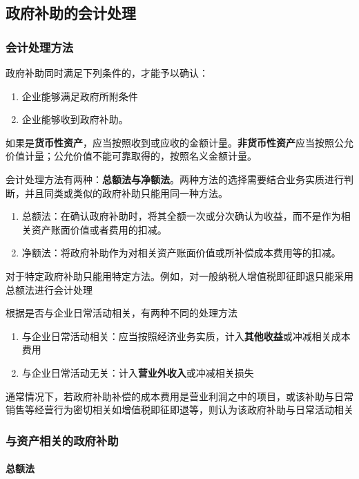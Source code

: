 \documentclass[UTF8,12pt]{ctexart}
\numberwithin{equation}{section} %
\numberwithin{figure}{section}
\numberwithin{table}{section}
\begin{document}
	\subsection{政府补助的会计处理}
	\subsubsection{会计处理方法}
	政府补助同时满足下列条件的，才能予以确认：
	\begin{enumerate}
		\item 企业能够满足政府所附条件
		
		\item 企业能够收到政府补助。
	\end{enumerate}
	
	如果是\textbf{货币性资产}，应当按照收到或应收的金额计量。\textbf{非货币性资产}应当按照公允价值计量；公允价值不能可靠取得的，按照名义金额计量。
	
	会计处理方法有两种：\textbf{总额法与净额法}。两种方法的选择需要结合业务实质进行判断，并且同类或类似的政府补助只能用同一种方法。
	\begin{enumerate}
		\item 总额法：在确认政府补助时，将其全额一次或分次确认为收益，而不是作为相关资产账面价值或者费用的扣减。
		
		\item 净额法：将政府补助作为对相关资产账面价值或所补偿成本费用等的扣减。
	\end{enumerate}
	
	对于特定政府补助只能用特定方法。例如，对一般纳税人增值税即征即退只能采用总额法进行会计处理
	
	根据是否与企业日常活动相关，有两种不同的处理方法
	\begin{enumerate}
		\item 与企业日常活动相关：应当按照经济业务实质，计入\textbf{其他收益}或冲减相关成本费用
		
		\item 与企业日常活动无关：计入\textbf{营业外收入}或冲减相关损失
	\end{enumerate}
	通常情况下，若政府补助补偿的成本费用是营业利润之中的项目，或该补助与日常销售等经营行为密切相关如增值税即征即退等，则认为该政府补助与日常活动相关
	
	\subsubsection{与资产相关的政府补助}
	\paragraph{总额法}
	
\end{document}
